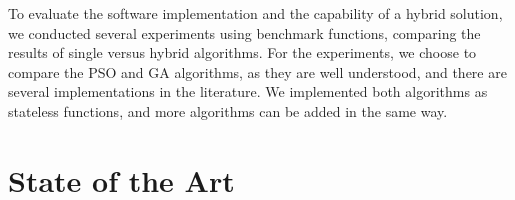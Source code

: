 \documentclass[runningheads]{llncs}
\begin{document}


To evaluate the software implementation and the capability of a hybrid solution,
we conducted several experiments using benchmark functions, comparing the
results of single versus hybrid algorithms. For the experiments, we choose to
compare the PSO and GA algorithms, as they are well understood, and there are
several implementations in the literature. We implemented both algorithms as
stateless functions, and more algorithms can be added in the same way.



\section{State of the Art}

\end{document}
